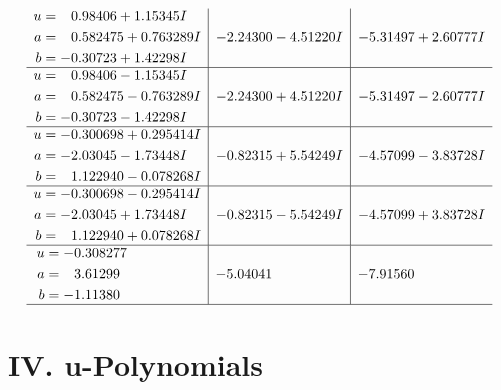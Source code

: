 \documentclass[1p]{elsarticle_modified}
\theoremstyle{definition}
\begin{document}
$$\begin{array}{c|c|c}
\begin{aligned}
u &= \phantom{-}0.98406 + 1.15345 I \\
a &= \phantom{-}0.582475 + 0.763289 I \\
b &= -0.30723 + 1.42298 I\end{aligned}
 & -2.24300 - 4.51220 I & -5.31497 + 2.60777 I \\ \hline\begin{aligned}
u &= \phantom{-}0.98406 - 1.15345 I \\
a &= \phantom{-}0.582475 - 0.763289 I \\
b &= -0.30723 - 1.42298 I\end{aligned}
 & -2.24300 + 4.51220 I & -5.31497 - 2.60777 I \\ \hline\begin{aligned}
u &= -0.300698 + 0.295414 I \\
a &= -2.03045 - 1.73448 I \\
b &= \phantom{-}1.122940 - 0.078268 I\end{aligned}
 & -0.82315 + 5.54249 I & -4.57099 - 3.83728 I \\ \hline\begin{aligned}
u &= -0.300698 - 0.295414 I \\
a &= -2.03045 + 1.73448 I \\
b &= \phantom{-}1.122940 + 0.078268 I\end{aligned}
 & -0.82315 - 5.54249 I & -4.57099 + 3.83728 I \\ \hline\begin{aligned}
u &= -0.308277\phantom{ +0.000000I} \\
a &= \phantom{-}3.61299\phantom{ +0.000000I} \\
b &= -1.11380\phantom{ +0.000000I}\end{aligned}
 & -5.04041\phantom{ +0.000000I} & -7.91560\phantom{ +0.000000I}\\
 \hline 
 \end{array}$$\newpage
\newpage\renewcommand{\arraystretch}{1}
\centering \section*{ IV. u-Polynomials}
\end{document}
